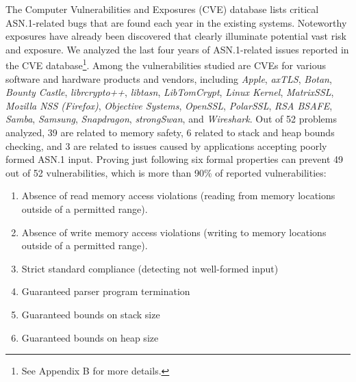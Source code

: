 \documentclass[10p,conference]{IEEEtran}
\begin{document}
The Computer Vulnerabilities and Exposures (CVE) database \cite{CVE}
lists critical ASN.1-related bugs that are found each year in the
existing systems. Noteworthy exposures have already been discovered
\cite{OpenSSLMemoryCorruption} that clearly illuminate potential vast
risk and exposure. We analyzed the last four years of ASN.1-related
issues reported in the CVE database\footnote{See Appendix B for more
  details.}.  Among the vulnerabilities studied are CVEs for various
software and hardware products and vendors, including \textit{Apple},
\textit{axTLS}, \textit{Botan}, \textit{Bounty Castle},
\textit{librcrypto++}, \textit{libtasn}, \textit{LibTomCrypt},
\textit{Linux Kernel}, \textit{MatrixSSL}, \textit{Mozilla NSS
  (Firefox)}, \textit{Objective Systems}, \textit{OpenSSL},
\textit{PolarSSL}, \textit{RSA BSAFE}, \textit{Samba},
\textit{Samsung}, \textit{Snapdragon}, \textit{strongSwan}, and
\textit{Wireshark}.  Out of 52 problems analyzed, 39 are related to
memory safety, 6 related to stack and heap bounds checking, and 3 are
related to issues caused by applications accepting poorly formed ASN.1
input. Proving just following six formal properties can prevent 49 out of 52
vulnerabilities, which is more than 90\% of reported vulnerabilities:

\begin{enumerate}

\item Absence of read memory access violations (reading from memory locations outside of a permitted range).
\item Absence of write memory access violations (writing to memory locations outside of a permitted range).
\item Strict standard compliance (detecting not well-formed input)
\item Guaranteed parser program termination
\item Guaranteed bounds on stack size
\item Guaranteed bounds on heap size
\end{enumerate}
\end{document}
